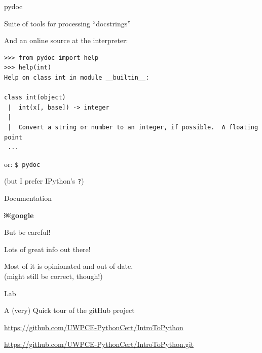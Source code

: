\documentclass{beamer}
\begin{document}
\begin{frame}[fragile]{pydoc}

{Suite of tools for processing ``docstrings''}

And an online source at the interpreter:

\begin{verbatim}
>>> from pydoc import help
>>> help(int)
Help on class int in module __builtin__:

class int(object)
 |  int(x[, base]) -> integer
 |  
 |  Convert a string or number to an integer, if possible.  A floating point
 ...
\end{verbatim}
or: \verb+$ pydoc+

(but I prefer IPython's  \verb+?+)

\end{frame} 

\begin{frame}[fragile]{Documentation}

{\LARGE￼\bf google}

\vspace{0.25in}
But  be careful!

\vspace{0.25in}
Lots of great info out there!

\vspace{0.25in}
Most of it is opinionated and out of date.\\
(might still be correct, though!)

\end{frame} 


\begin{frame}[fragile]{Lab}

\vfill
A (very) Quick tour of the gitHub project

\vfill
\url{https://github.com/UWPCE-PythonCert/IntroToPython}

\vfill
{\small
\url{https://github.com/UWPCE-PythonCert/IntroToPython.git}
}
\vfill

\end{frame} 
\end{document}
